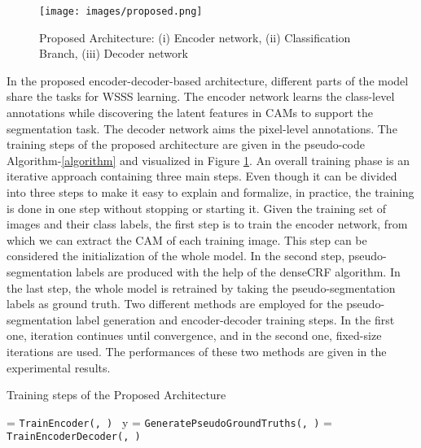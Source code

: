 \documentclass[sn-mathphys]{sn-jnl}
\theoremstyle{thmstyleone}
\theoremstyle{thmstyletwo}\newtheorem{example}{Example}\newtheorem{remark}{Remark}
\theoremstyle{thmstylethree}\newtheorem{definition}{Definition}
\begin{document}
\begin{figure}[H]
    \centering
    \texttt{[image: images/proposed.png]}
    \caption[Proposed Architecture]{Proposed Architecture: (i) Encoder network, (ii) Classification Branch, (iii) Decoder network}
    \label{proposed_architecture}
\end{figure}

In the proposed encoder-decoder-based architecture, different parts of the model share the tasks for WSSS learning. The encoder network learns the class-level annotations while discovering the latent features in CAMs to support the segmentation task. The decoder network aims the pixel-level annotations. The training steps of the proposed architecture are given in the pseudo-code Algorithm-\ref{algorithm} and visualized in Figure \ref{proposed_architecture}. An overall training phase is an iterative approach containing three main steps. Even though it can be divided into three steps to make it easy to explain and formalize, in practice, the training is done in one step without stopping or starting it. Given the training set of images and their class labels, the first step is to train the encoder network, from which we can extract the CAM of each training image. This step can be considered the initialization of the whole model. In the second step, pseudo-segmentation labels are produced with the help of the denseCRF algorithm. In the last step, the whole model is retrained by taking the pseudo-segmentation labels as ground truth. Two different methods are employed for the pseudo-segmentation label generation and encoder-decoder training steps. In the first one, iteration continues until convergence, and in the second one, fixed-size iterations are used. The performances of these two methods are given in the experimental results.


\begin{algorithm}
\caption{Training steps of the Proposed Architecture}\label{algorithm}
\begin{algorithmic}[1]
\State 
\State 
\State 
\State 
\State  = \texttt{TrainEncoder(, ) } 
    \State y = \texttt{GeneratePseudoGroundTruths(, )}  \State  = \texttt{TrainEncoderDecoder(, )} \EndFor
\State \Return {}
\EndProcedure
\end{algorithmic}
\end{algorithm}
\end{document}
